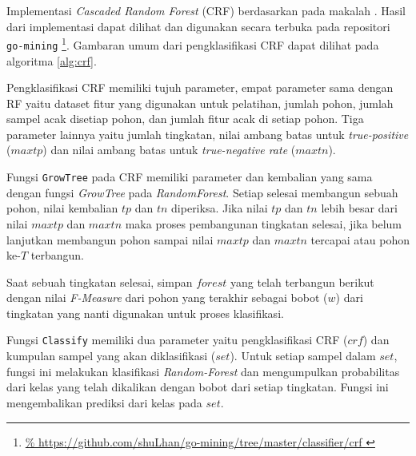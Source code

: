 Implementasi \textit{Cascaded Random Forest} (CRF) berdasarkan pada makalah
\textcite{baumann2013cascaded}.
Hasil dari implementasi dapat dilihat dan digunakan secara terbuka pada
repositori \texttt{go-mining}
\footnote{
\url{%
https://github.com/shuLhan/go-mining/tree/master/classifier/crf
}}.
Gambaran umum dari pengklasifikasi CRF dapat dilihat pada algoritma
\ref{alg:crf}.

Pengklasifikasi CRF memiliki tujuh parameter, empat parameter sama dengan RF
yaitu dataset fitur yang digunakan untuk pelatihan, jumlah pohon, jumlah sampel
acak disetiap pohon, dan jumlah fitur acak di setiap pohon.
Tiga parameter lainnya yaitu jumlah tingkatan, nilai ambang batas untuk
\textit{true-positive} ($maxtp$) dan nilai ambang batas untuk
\textit{true-negative rate} ($maxtn$).

	

Fungsi \texttt{GrowTree} pada CRF memiliki parameter dan kembalian yang sama
dengan fungsi \textit{GrowTree} pada \textit{RandomForest}.
Setiap selesai membangun sebuah pohon, nilai kembalian $tp$ dan $tn$ diperiksa.
Jika nilai $tp$ dan $tn$ lebih besar dari nilai $maxtp$ dan $maxtn$ maka proses
pembangunan tingkatan selesai, jika belum lanjutkan membangun pohon sampai
nilai $maxtp$ dan $maxtn$ tercapai atau pohon ke-$T$ terbangun.

Saat sebuah tingkatan selesai, simpan $forest$ yang telah terbangun berikut
dengan nilai \textit{F-Measure} dari pohon yang terakhir sebagai bobot ($w$)
dari tingkatan yang nanti digunakan untuk proses klasifikasi.

Fungsi \texttt{Classify} memiliki dua parameter yaitu pengklasifikasi CRF
($crf$) dan kumpulan sampel yang akan diklasifikasi ($set$).
Untuk setiap sampel dalam $set$, fungsi ini melakukan klasifikasi
\textit{Random-Forest} dan mengumpulkan probabilitas dari kelas yang telah
dikalikan dengan bobot dari setiap tingkatan.
Fungsi ini mengembalikan prediksi dari kelas pada $set$.

